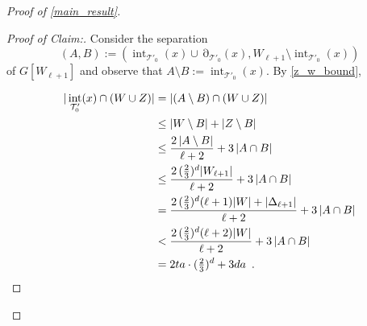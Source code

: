 \documentclass{patmorin}
\newenvironment{clmproof}{\begin{proof}[Proof of Claim:]\renewcommand{\qedsymbol}{\rule{1ex}{1ex}}}{\end{proof}}
\DeclareMathOperator{\interior}{int}
\DeclareMathOperator{\boundary}{\partial}
\begin{document}
\begin{proof}[Proof of \cref{main_result}]
  \begin{clmproof}
  Consider the separation
  \[
    (A,B):=(\interior_{\mathcal{T}'_0}(x)\cup\boundary_{\mathcal{T}'_0}(x),W_{\ell+1}\setminus\interior_{\mathcal{T}'_0}(x))
  \]
  of $G[W_{\ell+1}]$ and observe that $A\setminus B:=\interior_{\mathcal{T}'_0}(x)$.
  By \cref{z_w_bound},

  \begin{align*}
  |\interior_{\mathcal{T}'_0}(x)\cap (W\cup Z)|
  & = |(A\setminus B)\cap (W\cup Z)| \\
  & \le |W\setminus B| + |Z\setminus B| \\
  & \le
     \frac{2\,|A\setminus B|}{\ell+2} + 3\,|A\cap B| \\
  & \le \frac{2\,(\tfrac{2}{3})^d|W_{\ell+1}|}{\ell+2} + 3\,|A\cap B| \\
  & = \frac{2\,(\tfrac{2}{3})^d(\ell+1)|W|+|\Delta_{\ell+1}|}{\ell+2} + 3\,|A\cap B| \\
  & < \frac{2\,(\tfrac{2}{3})^d(\ell+2)|W|}{\ell+2} + 3\,|A\cap B| \\
  & = 2ta\cdot(\tfrac{2}{3})^d + 3da \enspace . \qedhere
  \end{align*}
  \end{clmproof}


\end{proof}
\end{document}
